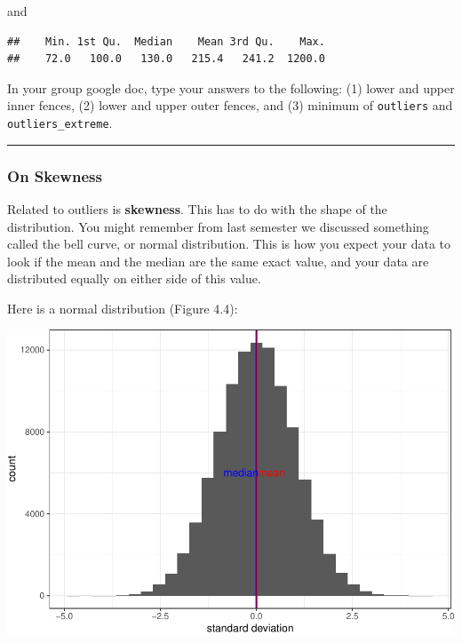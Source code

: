 \documentclass[
]{book}
\newenvironment{Shaded}{\begin{snugshade}}{\end{snugshade}}
\newcommand{\FunctionTok}[1]{\textcolor[rgb]{0.00,0.00,0.00}{#1}}
\newcommand{\NormalTok}[1]{#1}
\newcommand{\SpecialCharTok}[1]{\textcolor[rgb]{0.00,0.00,0.00}{#1}}
\begin{document}
and

\begin{Shaded}
\end{Shaded}

\begin{verbatim}
##    Min. 1st Qu.  Median    Mean 3rd Qu.    Max. 
##    72.0   100.0   130.0   215.4   241.2  1200.0
\end{verbatim}

In your group google doc, type your answers to the following: (1) lower and upper inner fences, (2) lower and upper outer fences, and (3) minimum of \texttt{outliers} and \texttt{outliers\_extreme}.

\begin{center}\rule{0.5\linewidth}{0.5pt}\end{center}

\hypertarget{on-skewness}{%
\subsubsection{\texorpdfstring{\textbf{On Skewness}}{On Skewness}}\label{on-skewness}}

Related to outliers is \textbf{skewness}. This has to do with the shape of the distribution. You might remember from last semester we discussed something called the bell curve, or normal distribution. This is how you expect your data to look if the mean and the median are the same exact value, and your data are distributed equally on either side of this value.

Here is a normal distribution (Figure 4.4):

\includegraphics{04-descriptive-statistics_files/figure-latex/unnamed-chunk-42-1.pdf}
\end{document}
